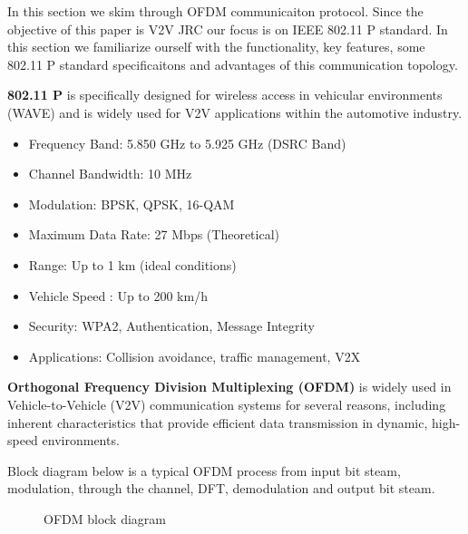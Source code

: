 \documentclass[conference]{IEEEtran}
\begin{document}
 
            In this section we skim through OFDM communicaiton protocol. Since the objective of this paper is V2V JRC our focus is on IEEE 802.11 P standard. In this section we familiarize ourself with the functionality, key features, some 802.11 P standard specificaitons and advantages of this communication topology.\par
    \textbf{  802.11 P} is specifically designed for wireless access in vehicular environments (WAVE) and is widely used for V2V applications within the automotive industry.
      
      \begin{itemize}
      \item Frequency Band:		5.850 GHz to 5.925 GHz (DSRC Band)
	\item Channel Bandwidth:	10 MHz
	\item Modulation:		BPSK, QPSK, 16-QAM
	\item Maximum Data Rate:	27 Mbps (Theoretical)
	\item Range: 			Up to 1 km (ideal conditions)
	\item Vehicle Speed :                Up to 200 km/h
	\item Security:			WPA2, Authentication, Message Integrity
	\item Applications:		Collision avoidance, traffic management, V2X
	\end{itemize}
	
 \textbf{ Orthogonal Frequency Division Multiplexing (OFDM)} is widely used in Vehicle-to-Vehicle (V2V) communication systems for several reasons, including inherent characteristics that provide efficient data transmission in dynamic, high-speed environments.

Block diagram below is a typical OFDM process from input bit steam, modulation, through the channel, DFT, demodulation and output bit steam. 

		\begin{figure}[H]
	    		\centering
	    		\caption{OFDM block diagram}
		\end{figure}
      
\end{document}
